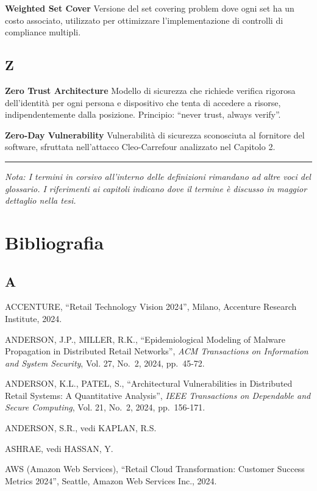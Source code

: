 \documentclass[12pt,a4paper,oneside]{book}
\numberwithin{figure}{chapter} %
\numberwithin{table}{chapter}  %
\begin{document}
\textbf{Weighted Set Cover} Versione del set covering problem dove ogni
set ha un costo associato, utilizzato per ottimizzare l'implementazione
di controlli di compliance multipli.

\section{Z}\label{z}

\textbf{Zero Trust Architecture} Modello di sicurezza che richiede
verifica rigorosa dell'identità per ogni persona e dispositivo che tenta
di accedere a risorse, indipendentemente dalla posizione. Principio:
``never trust, always verify''.

\textbf{Zero-Day Vulnerability} Vulnerabilità di sicurezza sconosciuta
al fornitore del software, sfruttata nell'attacco Cleo-Carrefour
analizzato nel Capitolo 2.

\begin{center}\rule{0.5\linewidth}{0.5pt}\end{center}

\emph{Nota: I termini in corsivo all'interno delle definizioni rimandano
ad altre voci del glossario. I riferimenti ai capitoli indicano dove il
termine è discusso in maggior dettaglio nella tesi.}

\chapter{Bibliografia}\label{bibliografia-3}

\section{A}\label{a-1}

ACCENTURE, ``Retail Technology Vision 2024'', Milano, Accenture Research
Institute, 2024.

ANDERSON, J.P., MILLER, R.K., ``Epidemiological Modeling of Malware
Propagation in Distributed Retail Networks'', \emph{ACM Transactions on
Information and System Security}, Vol. 27, No.~2, 2024, pp.~45-72.

ANDERSON, K.L., PATEL, S., ``Architectural Vulnerabilities in
Distributed Retail Systems: A Quantitative Analysis'', \emph{IEEE
Transactions on Dependable and Secure Computing}, Vol. 21, No.~2, 2024,
pp.~156-171.

ANDERSON, S.R., vedi KAPLAN, R.S.

ASHRAE, vedi HASSAN, Y.

AWS (Amazon Web Services), ``Retail Cloud Transformation: Customer
Success Metrics 2024'', Seattle, Amazon Web Services Inc., 2024.
\end{document}
